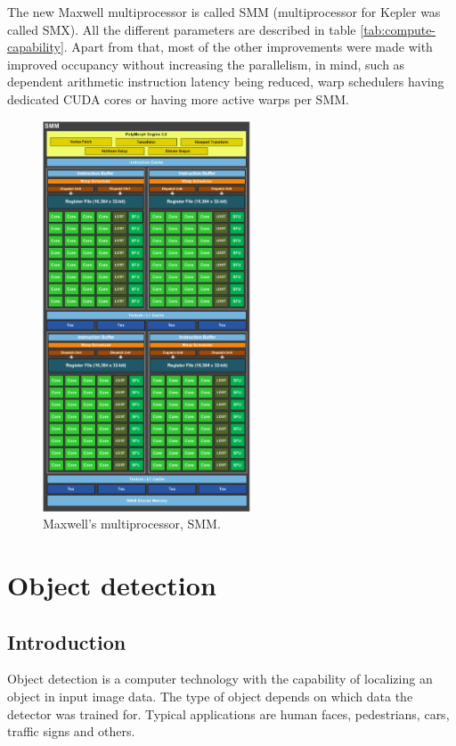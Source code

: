 The new Maxwell multiprocessor is called SMM (multiprocessor for Kepler was called SMX). All the different parameters are described in table \ref{tab:compute-capability}. Apart from that, most of the other improvements were made with improved occupancy without increasing the parallelism, in mind, such as dependent arithmetic instruction latency being reduced, warp schedulers having dedicated CUDA cores or having more active warps per SMM.

\begin{center}
\begin{figure}[ht]
	\centering\includegraphics[width=0.55\textwidth]{fig/smm.png}
	\caption{Maxwell's multiprocessor, SMM.	}\label{fig:smm}
\end{figure}
\end{center}

\chapter{Object detection}

\section{Introduction}

Object detection is a computer technology with the capability of localizing an object in input image data. The type of object depends on which data the detector was trained for. Typical applications are human faces, pedestrians, cars, traffic signs and others.

